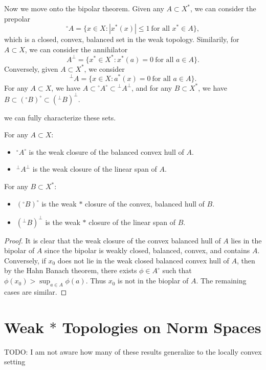 Now we move onto the bipolar theorem. Given any $A \subset X^*$, we can consider the prepolar
%
\[ {}^\circ A = \{ x \in X : |x^*(x)| \leq 1\ \text{for all $x^* \in A$} \}, \]
%
which is a closed, convex, balanced set in the weak topology. Similarily, for $A \subset X$, we can consider the annihilator
%
\[ A^\perp = \{ x^* \in X^* : x^*(a) = 0\ \text{for all $a \in A$} \}. \]
%
Conversely, given $A \subset X^*$, we consider
%
\[ {}^\perp A = \{ x \in X : a^*(x) = 0\ \text{for all $a \in A$} \}. \]
%
For any $A \subset X$, we have $A \subset {}^\circ A^\circ \subset {}^\perp A^\perp$, and for any $B \subset X^*$, we have $B \subset ({}^\circ B)^{\circ} \subset ({}^\perp B)^{\perp}$.

we can fully characterize these sets.

\begin{theorem}
    For any $A \subset X$:
    \begin{itemize}
        \item ${}^\circ A^\circ$ is the weak closure of the balanced convex hull of $A$.
        \item ${}^\perp A^\perp$ is the weak closure of the linear span of $A$.
    \end{itemize}
    For any $B \subset X^*$:
    \begin{itemize}
        \item $({}^\circ B)^{\circ}$ is the weak $*$ closure of the convex, balanced hull of $B$.
        \item $({}^\perp B)^{\perp}$ is the weak $*$ closure of the linear span of $B$.
    \end{itemize}
\end{theorem}
\begin{proof}
    It is clear that the weak closure of the convex balanced hull of $A$ lies in the bipolar of $A$ since the bipolar is weakly closed, balanced, convex, and contains $A$. Conversely, if $x_0$ does not lie in the weak closed balanced convex hull of $A$, then by the Hahn Banach theorem, there exists $\phi \in A^\circ$ such that $\phi(x_0) > \sup_{a \in A} \phi(a)$. Thus $x_0$ is not in the bioplar of $A$. The remaining cases are similar.
\end{proof}

\section{Weak $*$ Topologies on Norm Spaces}

TODO: I am not aware how many of these results generalize to the locally convex setting


